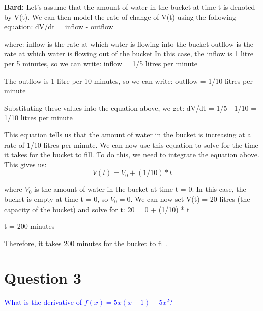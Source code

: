 \documentclass[11pt]{article} %
\begin{document}
\begin{mdframed}[
        backgroundcolor=white,  %
        linecolor=black,        %
        leftmargin=5pt,         %
        rightmargin=5pt,        %
        linewidth=2pt           %
    ]
    \textbf{Bard: } Let's assume that the amount of water in the bucket at time t is denoted by V(t). We can then model the rate of change of V(t) using the following equation:
    dV/dt = inflow - outflow

    where:
    inflow is the rate at which water is flowing into the bucket
    outflow is the rate at which water is flowing out of the bucket
    In this case, the inflow is 1 litre per 5 minutes, so we can write:
    inflow = 1/5 litres per minute

    The outflow is 1 litre per 10 minutes, so we can write:
    outflow = 1/10 litres per minute

    Substituting these values into the equation above, we get:
    dV/dt = 1/5 - 1/10 = 1/10 litres per minute

    This equation tells us that the amount of water in the bucket is increasing at a rate of 1/10 litres per minute. We can now use this equation to solve for the time it takes for the bucket to fill.
    To do this, we need to integrate the equation above. This gives us:
    $$
        V(t) = V_0 + (1/10) * t
    $$


    where $V_0$ is the amount of water in the bucket at time t = 0. In this case, the bucket is empty at time t = 0, so $V_0 = 0$.
    We can now set V(t) = 20 litres (the capacity of the bucket) and solve for t:
    20 = 0 + (1/10) * t

    t = 200 minutes

    Therefore, it takes 200 minutes for the bucket to fill.

\end{mdframed}




\section{Question 3}
\textcolor{blue}{What is the derivative of $f(x) = 5x(x-1) - 5x^2$?}
\end{document}
